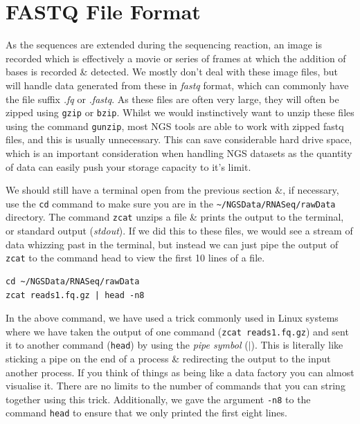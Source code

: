 \section{FASTQ File Format}
\begin{note}
As the sequences are extended during the sequencing reaction, an image is recorded which is effectively a movie or series of frames at which the addition of bases is recorded \& detected.
We mostly don't deal with these image files, but will handle data generated from these in \textit{fastq} format, which can commonly have the file suffix \textit{.fq} or \textit{.fastq}.
As these files are often very large, they will often be zipped using \texttt{gzip} or \texttt{bzip}.
Whilst we would instinctively want to unzip these files using the command \texttt{gunzip}, most NGS tools are able to work with zipped fastq files, and this is usually unnecessary.
This can save considerable hard drive space, which is an important consideration when handling NGS datasets as the quantity of data can easily push your storage capacity to it's limit. \\
\end{note}

\begin{steps}
We should still have a terminal open from the previous section \&, if necessary, use the \texttt{cd} command to make sure you are in the \texttt{\~{}/NGSData/RNASeq/rawData} directory.
The command \texttt{zcat} unzips a file \& prints the output to the terminal, or standard output (\textit{stdout}).
If we did this to these files, we would see a stream of data whizzing past in the terminal, but instead we can just pipe the output of \texttt{zcat} to the command head to view the first 10 lines of a file. \\
\begin{lstlisting}
cd ~/NGSData/RNASeq/rawData
zcat reads1.fq.gz | head -n8
\end{lstlisting}
\end{steps}

\begin{information}
In the above command, we have used a trick commonly used in Linux systems where we have taken the output of one command (\texttt{zcat reads1.fq.gz}) and sent it to another command (\texttt{head}) by using the \textit{pipe symbol} ($\mid$).
This is literally like sticking a pipe on the end of a process \& redirecting the output to the input another process.
If you think of things as being like a data factory you can almost visualise it.
There are no limits to the number of commands that you can string together using this trick. 
Additionally, we gave the argument \texttt{-n8} to the command \texttt{head} to ensure that we only printed the first eight lines.\\
\end{information}

